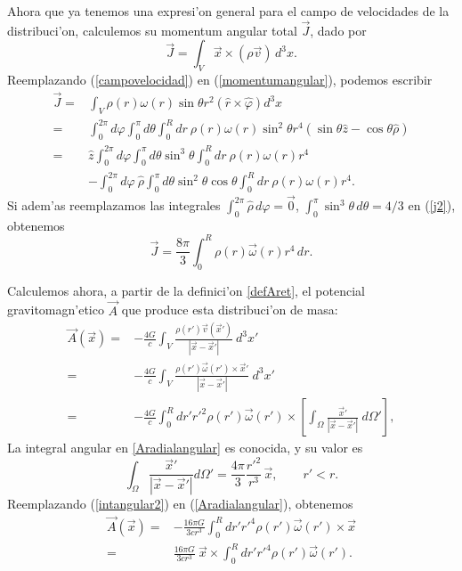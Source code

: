 Ahora que ya tenemos una expresi'on general para el campo de velocidades de la distribuci'on, calculemos su momentum angular total $\vec{J}$, dado por
\begin{equation}
\vec{J}=\int_V \vec{x}\times(\rho \vec{v})\,d^3x.\label{momentumangular}
\end{equation}
Reemplazando (\ref{campovelocidad}) en (\ref{momentumangular}), podemos escribir
\begin{align}
\vec{J}={}&\int_V \rho (r)\omega(r)\sin \theta r^2(\hat{r}\times\hat{\varphi })d^3x\\
 ={}&\int_0^{2\pi}d\varphi \int_0^{\pi}d\theta \int_0^{R}dr\ \rho (r)\omega(r)\sin^2 \theta r^4\left(\sin \theta \hat{z}-\cos \theta \hat{\rho}\right)\\
 ={}&\hat{z}\int_0^{2\pi}d\varphi \int_0^{\pi}d\theta \sin^3 \theta  \int_0^{R}dr\ \rho (r)\omega(r)r^4\nonumber\\
 {}&-\int_0^{2\pi}d\varphi \ \hat{\rho}\int_0^{\pi}d\theta \sin^2 \theta \cos \theta  \int_0^{R}dr\ \rho (r)\omega(r)r^4.\label{j2}
\end{align}
Si adem'as reemplazamos las integrales $\int_0^{2\pi}\hat{\rho}\,d\varphi =\vec{0}$, $\int_0^{\pi}\sin^3\theta\,d\theta  ={4}/{3}$ en (\ref{j2}), obtenemos
\begin{equation}\boxed{
\vec{J}=\frac{8\pi}{3}\int_0^{R}\rho (r)\vec{\omega}(r)r^4\, dr.}\label{jgeneral}
\end{equation}

Calculemos ahora, a partir de la definici'on \eqref{defAret}, el potencial gravitomagn'etico $\vec{A}$ que produce esta distribuci'on de masa:
\begin{align}
\vec{A}(\vec{x})={}&-\frac{4G}{c}\int_V \frac{\rho (r') \vec{v}(\vec{x}')}{|\vec{x}-\vec{x}'|}\ d^3x'\\
 ={}&-\frac{4G}{c}\int_V \frac{\rho (r') \vec{\omega}(r')\times\vec{x}'}{|\vec{x}-\vec{x}'|}\ d^3x'\\
 ={}&-\frac{4G}{c}\int_0^{R}dr'r'^2\rho (r')\vec{\omega}(r')\times\left[\int_{\Omega}\frac{\vec{x}'}{|\vec{x}-\vec{x}'|}\ d\Omega'\right],\label{Aradialangular}
\end{align}
La integral angular en \eqref{Aradialangular} es conocida, y su valor es
\begin{equation}
\int_{\Omega}\frac{\vec{x}'}{|\vec{x}-\vec{x}'|}d\Omega'=
\dfrac{4\pi}{3}\frac{r'^2}{r^3}\, \vec{x}, \qquad r'<r .\label{intangular2}
\end{equation}
Reemplazando (\ref{intangular2}) en (\ref{Aradialangular}), obtenemos
\begin{align}
\vec{A}(\vec{x})={}&-\frac{16\pi G}{3cr^3}\int_0^{R}dr'r'^4\rho (r')\vec{\omega}(r')\times\vec{x}\\
={}&\frac{16\pi G}{3cr^3}\ \vec{x}\times\int_0^{R}dr'r'^4\rho (r')\vec{\omega}(r').\label{Acasi}
\end{align}

